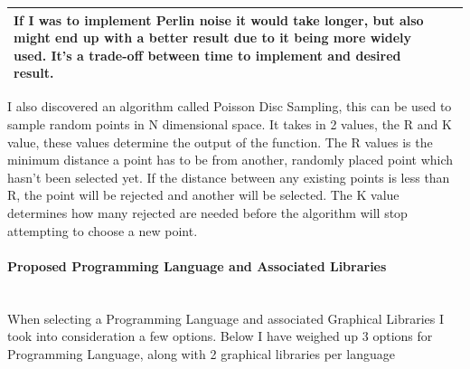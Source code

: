 \begin{flushleft}
\begin{center}
\begin{tabular}{| C{6cm} | C{6cm} |}
                                If I was to implement Perlin noise it would take longer, but also might end up with a better result
                                due to it being more widely used. It's a trade-off between time to implement and desired result. \\
                                \hline
                            \end{tabular}
                        \end{center}
                        
                        I also discovered an algorithm called Poisson Disc Sampling, this can be used to sample random points 
                        in N dimensional space. It takes in 2 values, the R and K value, these values determine the output of
                        the function. The R values is the minimum distance a point has to be from another, randomly placed point
                        which hasn't been selected yet. If the distance between any existing points is less than R, the point
                        will be rejected and another will be selected. The K value determines how many rejected are needed before 
                        the algorithm will stop attempting to choose a new point.
                        
                        \vspace{0.5cm}
                    \paragraph{Proposed Programming Language and Associated Libraries} \mbox{} \\
                        \vspace{0.2cm}
                        When selecting a Programming Language and associated Graphical Libraries I took into consideration a few options.
                        Below I have weighed up 3 options for Programming Language, along with 2 graphical libraries per language
                        

\end{flushleft}
